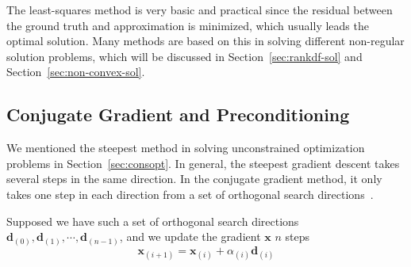 \par The least-squares method is very basic and practical since the residual between the ground truth and approximation is minimized, which usually leads the optimal solution. Many methods are based on this in solving different non-regular solution problems, which will be discussed in Section~\ref{sec:rankdf-sol} and Section~\ref{sec:non-convex-sol}. 

\subsection{Conjugate Gradient and Preconditioning}
We mentioned the steepest method in solving unconstrained optimization problems in Section~\ref{sec:consopt}. In general, the steepest gradient descent takes several steps in the same direction. In the conjugate gradient method, it only takes one step in each direction from a set of orthogonal search directions~\citep{HM:52}.
\par Supposed we have such a set of orthogonal search directions $\mathbf{d}_{(0)}, \mathbf{d}_{(1)}, \cdots, \mathbf{d}_{(n-1)}$, and we update the gradient $\mathbf{x}$ $n$ steps
\begin{equation}
    \label{equ:update-graident}
    \mathbf{x}_{(i+1)}=\mathbf{x}_{(i)}+\alpha_{(i)} \mathbf{d}_{(i)}
\end{equation}


